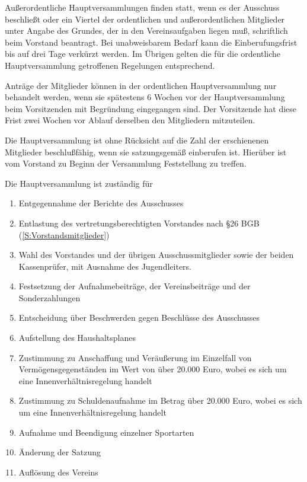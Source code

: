 \documentclass[10pt,a4paper,parskip=half]{scrartcl}
\begin{document}
\begin{contract}
    Außerordentliche Hauptversammlungen finden statt,
    wenn es der Ausschuss beschließt oder ein Viertel der ordentlichen und außerordentlichen Mitglieder unter Angabe des Grundes,
    der in den Vereinsaufgaben liegen muß,
    schriftlich beim Vorstand beantragt.
    Bei unabweisbarem Bedarf kann die Einberufungsfrist bis auf drei Tage verkürzt werden.
    Im Übrigen gelten die für die ordentliche Hauptversammlung getroffenen Regelungen entsprechend.
    
    Anträge der Mitglieder können in der ordentlichen Haupt\-ver\-samm\-lung nur behandelt werden,
    wenn sie spätestens 6 Wochen vor der Hauptversammlung beim Vorsitzenden mit Begründung eingegangen sind.
    Der Vorsitzende hat diese Frist zwei Wochen vor Ablauf derselben den Mitgliedern mitzuteilen.
    
    Die Hauptversammlung ist ohne Rücksicht auf die Zahl der erschienenen Mitglieder beschlußfähig,
    wenn sie satzungsgemäß einberufen ist.
    Hierüber ist vom Vorstand zu Beginn der Versammlung Feststellung zu treffen.
    
    Die Hauptversammlung ist zuständig für
    \begin{enumerate}[label=\alph*),noitemsep]
      \item Entgegennahme der Berichte des Ausschusses
      \item Entlastung des vertretungsberechtigten Vorstandes nach §26 BGB (\ref{S:Vorstandsmitglieder})
      \item Wahl des Vorstandes und der übrigen Ausschussmitglieder sowie der beiden Kassenprüfer,
            mit Ausnahme des Jugendleiters.
      \item Festsetzung der Aufnahmebeiträge,
            der Vereinsbeiträge und der Sonderzahlungen
      \item Entscheidung über Beschwerden gegen Beschlüsse des Ausschusses
      \item Aufstellung des Haushaltsplanes
      \item Zustimmung zu Anschaffung und Veräußerung im Einzelfall von Vermögensgegenständen im Wert von über 20.000 Euro,
            wobei es sich um eine Innenverhältnisregelung handelt
      \item Zustimmung zu Schuldenaufnahme im Betrag über 20.000 Euro,
            wobei es sich um eine Innenverhältnisregelung handelt
      \item Aufnahme und Beendigung einzelner Sportarten
      \item Änderung der Satzung
      \item Auflösung des Vereins
    \end{enumerate}
    

\end{contract}
\end{document}
